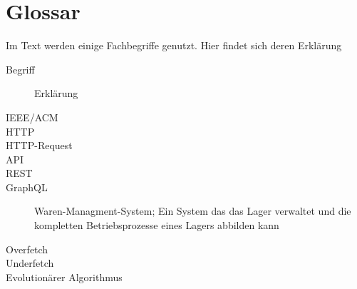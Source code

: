 \chapter{Glossar}

Im Text werden einige Fachbegriffe genutzt. Hier findet sich deren Erklärung

\begin{description}
    \item[Begriff] Erklärung
    \item[IEEE/ACM]
    \item[HTTP]
    \item[HTTP-Request]
    \item[API]
    \item[REST]
    \item[GraphQL] Waren-Managment-System; Ein System das das Lager verwaltet und die kompletten Betriebsprozesse eines Lagers abbilden kann
    \item[Overfetch]
    \item[Underfetch]
    \item[Evolutionärer Algorithmus]
\end{description}

